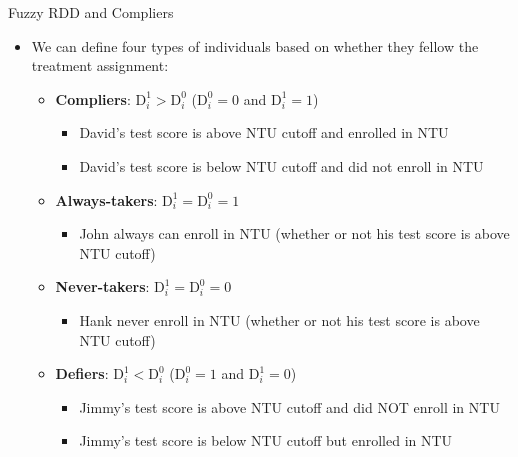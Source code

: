 \documentclass[hyperref={pdfpagelabels=false}]{beamer}
\begin{document}
\begin{frame}{Fuzzy RDD and Compliers}
	\begin{itemize}
		
		\item We can define four types of individuals based on whether they fellow the treatment assignment:
		\vspace{0.2cm}
		\begin{itemize}
			\vspace{0.3cm}
			\item \textbf{Compliers}: $\mathrm{D}^{1}_{i}>\mathrm{D}^{0}_{i}$ ($\mathrm{D}^{0}_{i}=0$ and $\mathrm{D}^{1}_{i}=1$)
			\begin{itemize}
				\item David's test score is above NTU cutoff and enrolled in NTU 
				\vspace{0.2cm}
				\item David's test score is below NTU cutoff and did not enroll in NTU 
			\end{itemize}
			\item \textbf{Always-takers}: $\mathrm{D}^{1}_{i}=\mathrm{D}^{0}_{i}=1$
			\begin{itemize}
				\item John always can enroll in NTU (whether or not his test score is above NTU cutoff)
				\vspace{0.2cm}
			\end{itemize}			
			\item \textbf{Never-takers}: $\mathrm{D}^{1}_{i}=\mathrm{D}^{0}_{i}=0$
			\begin{itemize}
				\item Hank never enroll in NTU (whether or not his test score is above NTU cutoff)
				\vspace{0.2cm}
			\end{itemize}			
			\item \textbf{Defiers}: $\mathrm{D}^{1}_{i}<\mathrm{D}^{0}_{i}$ ($\mathrm{D}^{0}_{i}=1$ and $\mathrm{D}^{1}_{i}=0$)
			\begin{itemize}
				\item Jimmy's test score is above NTU cutoff and did NOT enroll in NTU  
				\vspace{0.2cm}
				\item Jimmy's test score is below NTU cutoff but enrolled in NTU  
			\end{itemize}
			
			
		\end{itemize}
		
	\end{itemize}
\end{frame}
\end{document}
